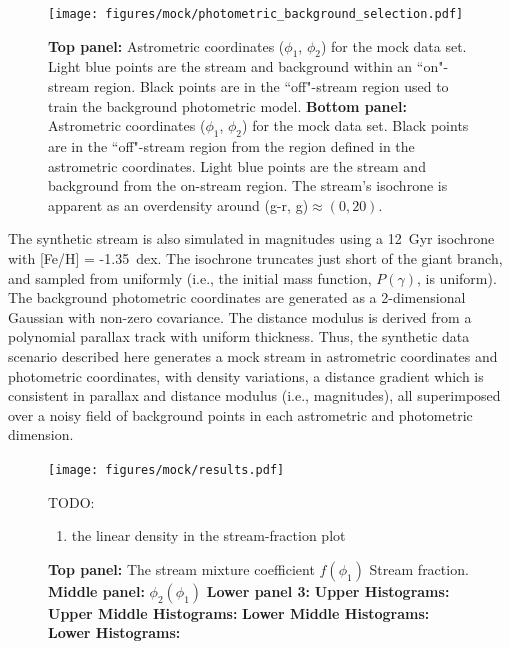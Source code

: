 \documentclass[twocolumn]{aastex631}
\begin{document}
        \begin{figure}
            \centering
            \texttt{[image: figures/mock/photometric\_background\_selection.pdf]}
            \caption{
                \textbf{Top panel:} Astrometric coordinates ($\phi_1$, $\phi_2$) for the mock data set.
                Light blue points are the stream and background within an ``on"-stream region. Black points are in the ``off"-stream region used to train the background photometric model.
                \textbf{Bottom panel:} Astrometric coordinates ($\phi_1$, $\phi_2$) for the mock data set.
                Black points are in the ``off"-stream region from the region defined in the astrometric coordinates.
                Light blue points are the stream and background from the on-stream region. The stream's isochrone is apparent as an overdensity around (g-r, g)$\approx (0, 20)$.
            }
            \label{fig:mock_data_photometric_background_selection}
        \end{figure}
    
        The synthetic stream is also simulated in magnitudes using a 12~Gyr isochrone with [Fe/H] = -1.35~dex. The isochrone truncates just short of the giant branch, and sampled from uniformly (i.e., the initial mass function, $P(\gamma)$, is uniform). The background photometric coordinates are generated as a 2-dimensional Gaussian with non-zero covariance. The distance modulus is derived from a polynomial parallax track with uniform thickness. Thus, the synthetic data scenario described here generates a mock stream in astrometric coordinates and photometric coordinates, with density variations, a distance gradient which is consistent in parallax and distance modulus (i.e., magnitudes), all superimposed over a noisy field of background points in each astrometric and photometric dimension.

        \begin{figure}
            \centering
            \texttt{[image: figures/mock/results.pdf]}
            \caption{
                \textbf{Top panel:}%
                The stream mixture coefficient $f(\phi_1)$ 
                Stream fraction.
                \textbf{Middle panel:}%
                $\phi_2(\phi_1)$
                \textbf{Lower panel 3:}%
                \textbf{Upper Histograms:}%
                \textbf{Upper Middle Histograms:}%
                \textbf{Lower Middle Histograms:}%
                \textbf{Lower Histograms:}%
            }
            TODO:
            \begin{enumerate}
                \item the linear density in the stream-fraction plot
            \end{enumerate}
            \label{fig:mock_data_result}
        \end{figure}
\end{document}
